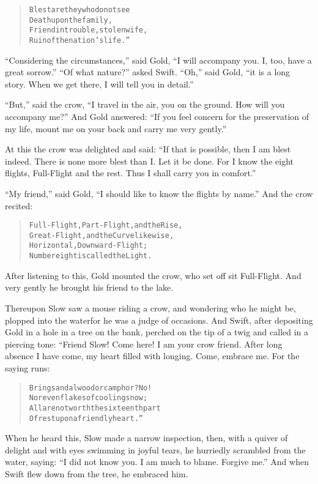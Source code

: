 \documentclass[article, twoside, 14pt]{memoir}
\renewenvironment{verbatim}{%
\begin{quote}%
\vskip -10pt%
\begin{alltt}\normalfont\large}{\end{alltt}%
\end{quote}%
\vskip -10pt
} %
\begin{document}
\begin{verbatim}
Blest are they who do not see
Death upon the family,
Friend in trouble, stolen wife,
Ruin of the nation's life.”
\end{verbatim}
``Considering the circumstances,'' said Gold,
``I will accompany you. I, too, have a great sorrow.''
``Of what nature?'' asked Swift. ``Oh,'' said Gold,
``it is a long story. When we get there, I will tell you in detail.''

``But,'' said the crow,
``I travel in the air, you on the ground. How will you accompany me?''
And Gold answered:
``If you feel concern for the preservation of my life, mount me on your back and carry me very gently.''

At this the crow was delighted and said:
``If that is possible, then I am blest indeed. There is none more blest than I. Let it be done. For I know the eight flights, Full-Flight and the rest. Thus I shall carry you in comfort.''

``My friend,'' said Gold,
``I should like to know the flights by name.'' And the crow
recited:

\begin{verbatim}
Full-Flight, Part-Flight, and the Rise,
Great-Flight, and the Curve likewise,
Horizontal, Downward-Flight;
Number eight is called the Light.
\end{verbatim}
After listening to this, Gold mounted the crow, who set off
sit Full-Flight. And very gently he brought his friend to the
lake.

Thereupon Slow saw a mouse riding a crow, and wondering who he
might be, plopped into the water{\textemdash}for he was a judge of occasions.
And Swift, after depositing Gold in a hole in a tree on the bank,
perched on the tip of a twig and called in a piercing tone: “Friend
Slow! Come here! I am your crow friend. After long absence I have
come, my heart filled with longing. Come, embrace me. For the
saying runs:

\begin{verbatim}
Bring sandalwood or camphor? No!
Nor even flakes of cooling snow;
All are not worth the sixteenth part
Of rest upon a friendly heart.”
\end{verbatim}
When he heard this, Slow made a narrow inspection, then, with a
quiver of delight and with eyes swimming in joyful tears, he
hurriedly scrambled from the water, saying:
``I did not know you. I am much to blame. Forgive me.'' And when
Swift flew down from the tree, he embraced him.
\end{document}
